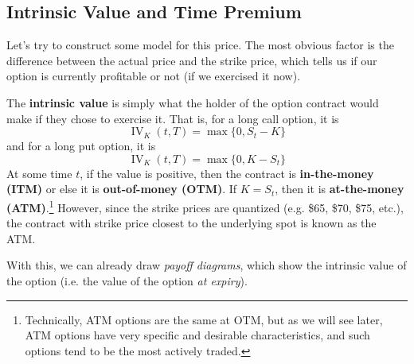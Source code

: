 \documentclass{article}
\DeclareMathOperator{\IV}{IV}
\begin{document}
  \subsection{Intrinsic Value and Time Premium}

    Let's try to construct some model for this price. The most obvious factor is the difference between the actual price and the strike price, which tells us if our option is currently profitable or not (if we exercised it now). 

    \begin{definition}
      The \textbf{intrinsic value} is simply what the holder of the option contract would make if they chose to exercise it. That is, for a long call option, it is 
      \begin{equation}
        \IV_K (t, T) = \max\{0, S_t - K\}
      \end{equation}
      and for a long put option, it is 
      \begin{equation}
        \IV_K (t, T) = \max\{0, K - S_t\}
      \end{equation}
      At some time $t$, if the value is positive, then the contract is \textbf{in-the-money (ITM)} or else it is \textbf{out-of-money (OTM)}. If $K = S_t$, then it is \textbf{at-the-money (ATM)}.\footnote{Technically, ATM options are the same at OTM, but as we will see later, ATM options have very specific and desirable characteristics, and such options tend to be the most actively traded. } However, since the strike prices are quantized (e.g. \$65, \$70, \$75, etc.), the contract with strike price closest to the underlying spot is known as the ATM. 
    \end{definition}

    With this, we can already draw \textit{payoff diagrams}, which show the intrinsic value of the option (i.e. the value of the option \textit{at expiry}). 
\end{document}
